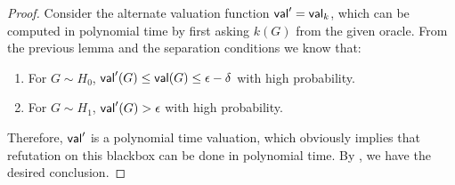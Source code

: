 \documentclass[final,12pt]{colt2023} %
\newcommand\1[1]{\mathbb{I}_{\left\{#1\right\}}}
\begin{document}
\begin{proof}
Consider the alternate valuation function $\mathsf{val}'=\mathsf{val}_k$, which can be computed in polynomial time by first asking $k(G)$ from the given oracle. From the previous lemma and the separation conditions we know that:
\begin{enumerate}
    \item For $G\sim H_0$, $\mathsf{val}'(G)\leq \mathsf{val}(G)\leq \epsilon-\delta$ with high probability.
    \item For $G\sim H_1$, $\mathsf{val}'(G)> \epsilon$ with high probability.
\end{enumerate}
Therefore, $\mathsf{val}'$ is a polynomial time valuation, which obviously implies that refutation on this blackbox can be done in polynomial time. By , we have the desired conclusion. 
\end{proof}
\end{document}
